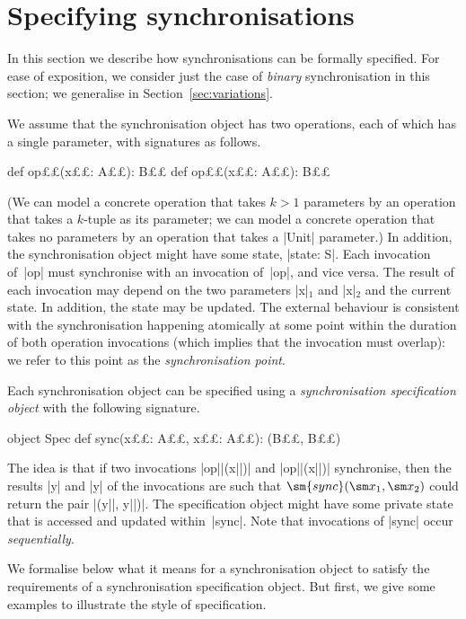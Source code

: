 \section{Specifying synchronisations}
\label{sec:spec}

In this section we describe how synchronisations can be formally specified.
For ease of exposition, we consider just the case of \emph{binary}
synchronisation in this section; we generalise in
Section~\ref{sec:variations}.

We assume that the synchronisation object has two operations, each of which
has a single parameter, with signatures as follows.
%
\begin{scala}
  def op££(x££: A££): B££
  def op££(x££: A££): B££
\end{scala}
%
(We can model a concrete operation that takes $k > 1$ parameters by an
operation that takes a $k$-tuple as its parameter; we can model a concrete
operation that takes no parameters by an operation that takes a |Unit|
parameter.) 
%
In addition, the synchronisation object might have some state, |state: S|.
Each invocation of~|op| must synchronise with an invocation of~|op|, and
vice versa.  The result of each invocation may depend on the two parameters
|x|$_1$ and |x|$_2$ and the current state.  In addition, the state may be
updated.  The external behaviour is consistent with the synchronisation
happening atomically at some point within the duration of both operation
invocations (which implies that the invocation must overlap): we refer to this
point as the \emph{synchronisation point}.

Each synchronisation object can be specified using a \emph{synchronisation
  specification object} with the following signature.
%
\begin{scala}
object Spec{
  def sync(x££: A££, x££: A££): (B££, B££)
}
\end{scala}
%
The idea is that if two invocations |op||(x||)| and |op||(x||)|
synchronise, then the results |y| and |y| of the invocations are such
that $\sm{sync}(\sm x_1, \sm x_2)$ could return the pair |(y||, y||)|.
The specification object might have some private state that is accessed and
updated within~|sync|.  Note that invocations of |sync| occur
\emph{sequentially}.

We formalise below what it means for a synchronisation object to satisfy the
requirements of a synchronisation specification object.  But first, we give
some examples to illustrate the style of specification. 

